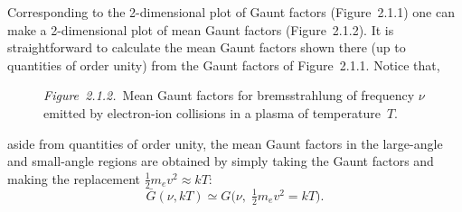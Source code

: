 Corresponding to the 2-dimensional plot of Gaunt factors (Figure~2.1.1) one
can make a 2-dimensional plot of mean Gaunt factors (Figure~2.1.2).  It is
straightforward to calculate the mean Gaunt factors shown there (up to
quantities of order unity) from the Gaunt factors of Figure~2.1.1.  Notice that,


\begin{figure}[htbp]
\centering
\caption{\textit{Figure~2.1.2.}\ Mean Gaunt factors for bremsstrahlung of frequency $\nu$ emitted by
electron-ion collisions in a plasma of temperature~$T$.}
\label{fig:2.1.2}
\end{figure}

aside from quantities of order unity, the mean Gaunt factors in the large-angle
and small-angle regions are obtained by simply taking the Gaunt
factors and making the replacement $\frac{1}{2}m_e v^2 \approx kT$:
\begin{equation}
\bar{G}(\nu,kT) \simeq G\bigl(\nu,\;\tfrac{1}{2}m_e v^2 = kT\bigr).
\end{equation}

